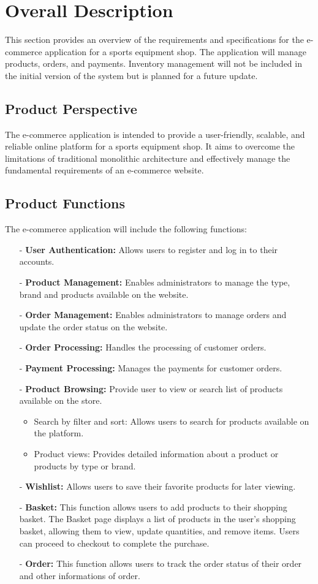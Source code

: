 

\section{Overall Description}
This section provides an overview of the requirements and specifications for the e-commerce application for a sports equipment shop. The application will manage products, orders, and payments. Inventory management will not be included in the initial version of the system but is planned for a future update.
\subsection{Product Perspective}
The e-commerce application is intended to provide a user-friendly, scalable, and reliable online platform for a sports equipment shop. It aims to overcome the limitations of traditional monolithic architecture and effectively manage the fundamental requirements of an e-commerce website.
\subsection{Product Functions}
The e-commerce application will include the following functions:
\begin{itemize}
    \item[-] \textbf{User Authentication:} Allows users to register and log in to their accounts.
    \item[-] \textbf{Product Management:} Enables administrators to manage the type, brand and products available on the website.
    \item[-] \textbf{Order Management:} Enables administrators to manage orders and update the order status on the website.
    \item[-] \textbf{Order Processing:} Handles the processing of customer orders.
    \item[-] \textbf{Payment Processing:} Manages the payments for customer orders.
    \item[-] \textbf{Product Browsing:} Provide user to view or search list of products available on the store.
          \begin{itemize}
              \item Search by filter and sort: Allows users to search for products available on the platform.
              \item Product views: Provides detailed information about a product or products by type or brand.
          \end{itemize}
    \item[-] \textbf{Wishlist: } Allows users to save their favorite products for later viewing.
    \item[-] \textbf{Basket: } This function allows users to add products to their shopping basket. The Basket page displays a list of products in the user's shopping basket, allowing them to view, update quantities, and remove items. Users can proceed to checkout to complete the purchase.
    \item[-] \textbf{Order: } This function allows users to track the order status of their order and other informations of order.
\end{itemize}
